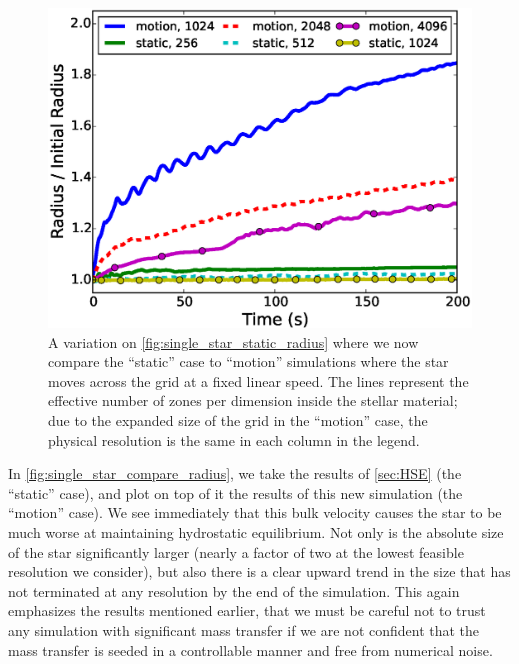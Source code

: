 \documentclass[12pt]{article}
\begin{document}
\begin{figure}[h!]
  \centering
  \includegraphics[scale=0.8,trim=0.1in 0.0in 0.6in 0.6in,clip]{plots/single_star_compare_1e3_radius}
  \caption[Moving star versus static star]
          {A variation on \autoref{fig:single_star_static_radius} where
           we now compare the ``static'' case to ``motion'' simulations where the
           star moves across the grid at a fixed linear speed. The lines represent
           the effective number of zones per dimension inside the stellar material;
           due to the expanded size of the grid in the ``motion'' case, the
           physical resolution is the same in each column in the legend.
           \label{fig:single_star_compare_radius}}
\end{figure}

In \autoref{fig:single_star_compare_radius}, we take the results of
\autoref{sec:HSE} (the ``static'' case), and plot on top of it the
results of this new simulation (the ``motion'' case). We see
immediately that this bulk velocity causes the star to be much worse
at maintaining hydrostatic equilibrium. Not only is the absolute size
of the star significantly larger (nearly a factor of two at the lowest
feasible resolution we consider), but also there is a clear upward
trend in the size that has not terminated at any resolution by the end
of the simulation.  This again emphasizes the results mentioned
earlier, that we must be careful not to trust any simulation with
significant mass transfer if we are not confident that the mass
transfer is seeded in a controllable manner and free from numerical
noise.
\end{document}
